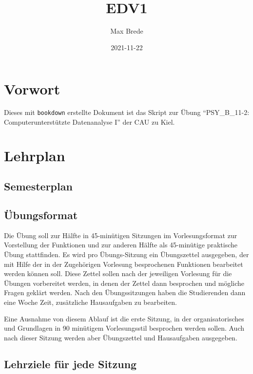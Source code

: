 \documentclass[
]{book}
\title{EDV1}
\author{Max Brede}
\date{2021-11-22}
\begin{document}
\maketitle

{
\setcounter{tocdepth}{1}
\tableofcontents
}
\hypertarget{vorwort}{%
\chapter{Vorwort}\label{vorwort}}

\scriptsize

Dieses mit \texttt{bookdown} erstellte Dokument ist das Skript zur Übung ``PSY\_B\_11-2: Computerunterstützte Datenanalyse I'' der CAU zu Kiel.

\hypertarget{lehrplan}{%
\chapter{Lehrplan}\label{lehrplan}}

\hypertarget{semesterplan}{%
\section{Semesterplan}\label{semesterplan}}

\hypertarget{uxfcbungsformat}{%
\section{Übungsformat}\label{uxfcbungsformat}}

Die Übung soll zur Hälfte in 45-minütigen Sitzungen im Vorlesungsformat zur Vorstellung der Funktionen und zur anderen Hälfte als 45-minütige praktische Übung stattfinden.
Es wird pro Übungs-Sitzung ein Übungszettel ausgegeben, der mit Hilfe der in der Zugehörigen Vorlesung besprochenen Funktionen bearbeitet werden können soll.
Diese Zettel sollen nach der jeweiligen Vorlesung für die Übungen vorbereitet werden, in denen der Zettel dann besprochen und mögliche Fragen geklärt werden.
Nach den Übungssitzungen haben die Studierenden dann eine Woche Zeit, zusätzliche Hausaufgaben zu bearbeiten.

Eine Ausnahme von diesem Ablauf ist die erste Sitzung, in der organisatorisches und Grundlagen in 90 minütigem Vorlesungsstil besprochen werden sollen. Auch nach dieser Sitzung werden aber Übungszettel und Hausaufgaben ausgegeben.

\hypertarget{lehrziele-fuxfcr-jede-sitzung}{%
\section{Lehrziele für jede Sitzung}\label{lehrziele-fuxfcr-jede-sitzung}}
\end{document}
